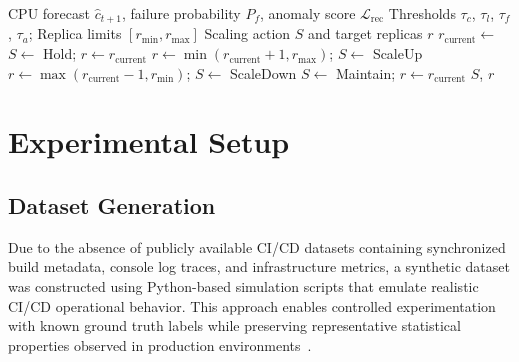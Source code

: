 \documentclass[a4paper,fleqn]{cas-dc}
\begin{document}
\begin{algorithm}[htbp]
\caption{Predictive Autoscaling Decision Algorithm}\label{algo:autoscale}
\begin{algorithmic}[1]
\Require CPU forecast $\hat{c}_{t+1}$, failure probability $P_f$, anomaly score $\mathcal{L}_{\mathrm{rec}}$
\Require Thresholds $\tau_c$, $\tau_l$, $\tau_f$, $\tau_a$;
Replica limits $[r_{\mathrm{min}}, r_{\mathrm{max}}]$
\Ensure Scaling action $S$ and target replicas $r$
\State $r_{\mathrm{current}} \gets$ 
    \State {}
\EndIf
{}
    \State $S \gets$ \textrm{Hold};
$r \gets r_{\mathrm{current}}$
    \State $r \gets \min(r_{\mathrm{current}} + 1, r_{\mathrm{max}})$;
$S \gets$ \textrm{ScaleUp}
    \State $r \gets \max(r_{\mathrm{current}} - 1, r_{\mathrm{min}})$;
$S \gets$ \textrm{ScaleDown}
\Else
    \State $S \gets$ \textrm{Maintain};
$r \gets r_{\mathrm{current}}$
\EndIf
\State {}
\State \Return $S$, $r$
\end{algorithmic}
\end{algorithm}

\section{Experimental Setup}\label{sec:experimental}

\subsection{Dataset Generation}\label{subsec:dataset}

Due to the absence of publicly available CI/CD datasets containing synchronized build metadata, console log traces, and infrastructure metrics, a synthetic dataset was constructed using Python-based simulation scripts that emulate realistic CI/CD operational behavior.
This approach enables controlled experimentation with known ground truth labels while preserving representative statistical properties observed in production environments~\citep{rausch2017empirical, beller2017oops}.
\end{document}
